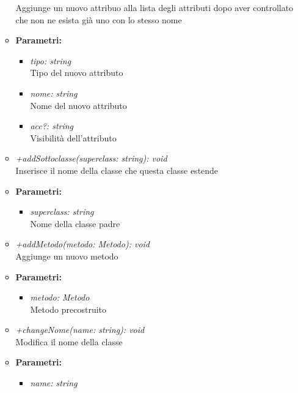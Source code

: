 \begin{itemize}
\begin{itemize}
            			Aggiunge un nuovo attribuo alla lista degli attributi dopo aver controllato che non ne esista già uno con lo stesso nome
            			\item \textbf{Parametri:}\\
            				\begin{itemize}
            					\item \emph{tipo: string}\\
            					Tipo del nuovo attributo
            					\item \emph{nome: string}\\
            					Nome del nuovo attributo
            					\item \emph{acc?: string}\\
            					Visibilità dell'attributo
            				\end{itemize}
            			\item \emph{+addSottoclasse(superclass: string): void}\\
            			Inserisce il nome della classe che questa classe estende
            			\item \textbf{Parametri:}\\
            				\begin{itemize}
            					\item \emph{superclass: string}\\
            					Nome della classe padre
            				\end{itemize}
            			\item \emph{+addMetodo(metodo: Metodo): void}\\
            			Aggiunge un nuovo metodo
            			\item \textbf{Parametri:}\\
            				\begin{itemize}
            					\item \emph{metodo: Metodo}\\
            					Metodo precostruito
            				\end{itemize}
            			\item \emph{+changeNome(name: string): void}\\
            			Modifica il nome della classe
            			\item \textbf{Parametri:}\\
            				\begin{itemize}
            					\item \emph{name: string}\\

\end{itemize}
\end{itemize}
\end{itemize}
